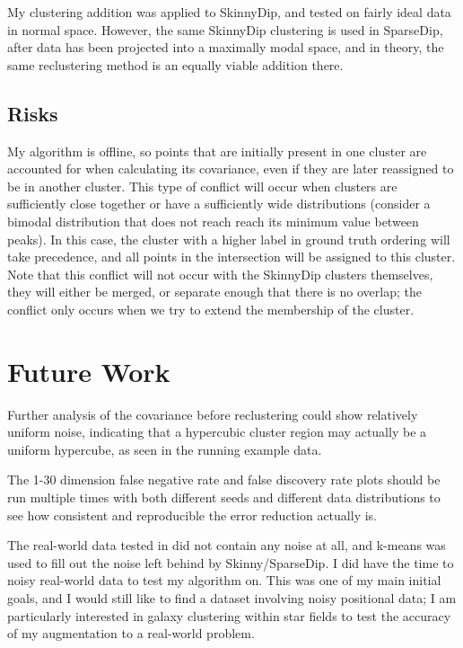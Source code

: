 \documentclass{sig-alternate-05-2015}
\begin{document}
My clustering addition was applied to SkinnyDip, and tested on fairly ideal data in normal space. However, the same SkinnyDip clustering is used in SparseDip, after data has been projected into a maximally modal space, and in theory, the same reclustering method is an equally viable addition there.

\subsection{Risks}

My algorithm is offline, so points that are initially present in one cluster are accounted for when calculating its covariance, even if they are later reassigned to be in another cluster. This type of conflict will occur when clusters are sufficiently close together or have a sufficiently wide distributions (consider a bimodal distribution that does not reach reach its minimum value between peaks). In this case, the cluster with a higher label in ground truth ordering will take precedence, and all points in the intersection will be assigned to this cluster. Note that this conflict will not occur with the SkinnyDip clusters themselves, they will either be merged, or separate enough that there is no overlap; the conflict only occurs when we try to extend the membership of the cluster.


\section{Future Work}
Further analysis of the covariance before reclustering could show relatively uniform noise, indicating that a hypercubic cluster region may actually be a uniform hypercube, as seen in the running example data.

The 1-30 dimension false negative rate and false discovery rate plots should be run multiple times with both different seeds and different data distributions to see how consistent and reproducible the error reduction actually is.

The real-world data tested in \cite{skinnydip} did not contain any noise at all, and k-means was used to fill out the noise left behind by Skinny/SparseDip. I did have the time to noisy real-world data to test my algorithm on. This was one of my main initial goals, and I would still like to find a dataset involving noisy positional data; I am particularly interested in galaxy clustering within star fields to test the accuracy of my augmentation to a real-world problem.
\end{document}
